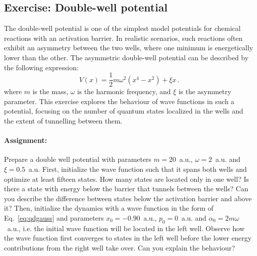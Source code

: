 \subsection*{Exercise: Double-well potential}

The double-well potential is one of the simplest model potentials for chemical reactions with an activation barrier. In realistic scenarios, such reactions often exhibit an asymmetry between the two wells, where one minimum is energetically lower than the other. The asymmetric double-well potential can be described by the following expression:
\begin{equation*}
    V(x) = \frac{1}{2}m\omega^2(x^4 - x^2) + \xi x \, .
\end{equation*}
where $m$ is the mass, $\omega$ is the harmonic frequency, and $\xi$ is the asymmetry parameter. This exercise explores the behaviour of wave functions in such a potential, focusing on the number of quantum states localized in the wells and the extent of tunnelling between them.

\paragraph{Assignment:} Prepare a double well potential with parameters $m=20$~a.u., $\omega=2$~a.u. and $\xi=0.5$~a.u. First, initialize the wave function such that it spans both wells and optimize at least fifteen states. 
How many states are located only in one well? Is there a state with energy below the barrier that tunnels between the wells? Can you describe the difference between states below the activation barrier and above it?
Then, initialize the dynamics with a wave function in the form of Eq.~\eqref{eq:qdgauss} and parameters $x_0=-0.90$~a.u., $p_0=0$~a.u. and $\alpha_0 = 2m\omega$~a.u., i.e. the initial wave function will be located in the left well. Observe how the wave function first converges to states in the left well before the lower energy contributions from the right well take over. Can you explain the behaviour?







